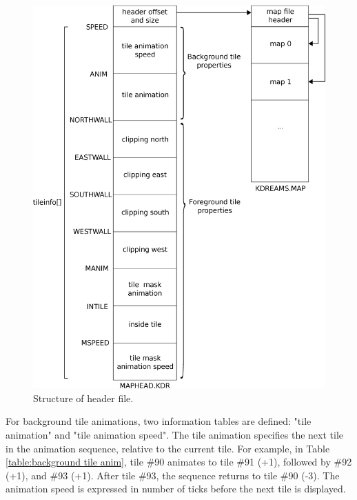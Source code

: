 \documentclass[book.tex]{subfiles}
\begin{document}
\begin{figure}[H]
\centering
 \includegraphics[width=1.0\textwidth]{imgs/drawings/map_header.eps}
 \caption{Structure of  header file.}
 \label{fig:map-header-file}
\end{figure}
\par 
For background tile animations, two information tables are defined: "tile animation" and "tile animation speed". The tile animation specifies the next tile in the animation sequence, relative to the current tile. For example, in Table \ref{table:background tile anim}, tile \#90 animates to tile \#91 (+1), followed by \#92 (+1), and \#93 (+1). After tile \#93, the sequence returns to tile \#90 (-3). The animation speed is expressed in number of ticks before the next tile is displayed. \\
\end{document}
